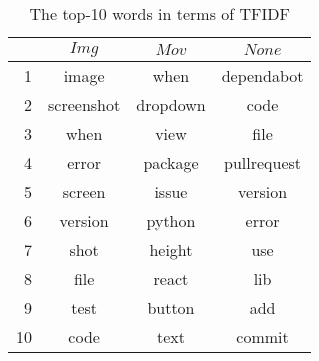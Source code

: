 \begin{table}[t]
  \begin{center}
  \caption{The top-10 words in terms of TFIDF}
  \begin{tabular}{r | c c c}
    \hline
     & $Img$ & $Mov$ & $None$\\
    \hline
    1 & image & when & dependabot\\
    2 & screenshot & dropdown & code\\
    3 & when & view & file\\
    4 & error & package & pullrequest\\
    5 & screen & issue & version\\
    6 & version & python & error\\
    7 & shot & height & use\\
    8 & file & react & lib\\
    9 & test & button & add\\
    10& code & text & commit\\
    \hline
  \end{tabular}\\
  \label{tab:tfidf-result}
  \end{center}
\end{table}